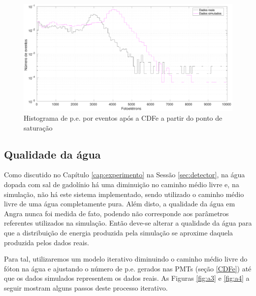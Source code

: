 \begin{figure}[H]
	\centering
	\includegraphics[width=12cm]{textuais/simulacao/figuras/hist_evt6.pdf}
	\caption{Histograma de p.e. por eventos após a CDFe a partir do ponto de saturação}
	\label{fig:cdfe}
\end{figure}

\subsection{Qualidade da água}

Como discutido no Capítulo \ref{cap:experimento} na Sessão \ref{sec:detector}, na água dopada com sal de gadolínio há uma diminuição no caminho médio livre e, na simulação, não há este sistema implementado, sendo utilizado o caminho médio livre de uma água completamente pura. Além disto, a qualidade da água em Angra nunca foi medida de fato, podendo não corresponde aos parâmetros referentes utilizados na simulação. Então deve-se alterar a qualidade da água para que a distribuição de energia produzida pela simulação se aproxime daquela produzida pelos dados reais.

Para tal, utilizaremos um modelo iterativo diminuindo o caminho médio livre do fóton na água e ajustando o número de p.e. gerados nas PMTs (seção \ref{CDFe}) até que os dados simulados representem os dados reais. As Figuras \ref{fig:a3} e \ref{fig:a4} a seguir mostram alguns passos deste processo iterativo.



